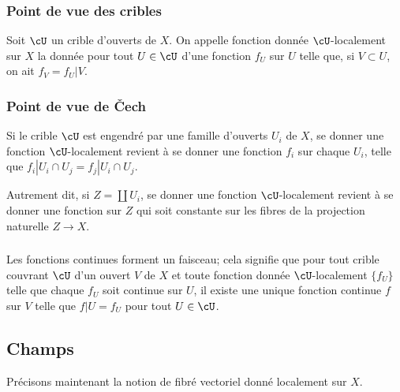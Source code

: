 \subsubsection{Point de vue des cribles}\label{I:1-2-1}

Soit $\cU$ un crible d'ouverts de $X$. On appelle fonction donnée 
$\cU$-localement sur $X$ la donnée pour tout $U\in \cU$ d'une fonction $f_U$ 
sur $U$ telle que, si $V\subset U$, on ait $f_V=f_U|V$. 





\subsubsection{Point de vue de Čech}\label{I:1-2-2}

Si le crible $\cU$ est engendré par une famille d'ouverts $U_i$ de $X$, se 
donner une fonction $\cU$-localement revient à se donner une fonction $f_i$ 
sur chaque $U_i$, telle que $f_i|{U_i\cap U_j} = f_j|{U_i\cap U_j}$. 

Autrement dit, si $Z=\coprod U_i$, se donner une fonction $\cU$-localement 
revient à se donner une fonction sur $Z$ qui soit constante sur les fibres de 
la projection naturelle $Z\to X$. 





\subsubsection{}\label{I:1-2-3}

Les fonctions continues forment un faisceau; cela signifie que pour tout crible 
couvrant $\cU$ d'un ouvert $V$ de $X$ et toute fonction donnée 
$\cU$-localement $\{f_U\}$ telle que chaque $f_U$ soit continue sur $U$, il 
existe une unique fonction continue $f$ sur $V$ telle que $f|U=f_U$ pour tout 
$U\in \cU$.










\subsection{Champs}\label{I:1-3}

Précisons maintenant la notion de fibré vectoriel donné localement sur $X$. 





